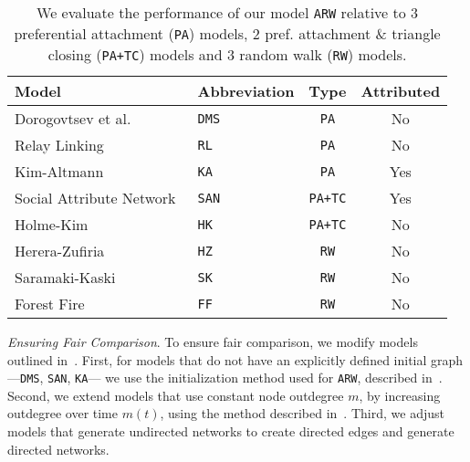 \begin{table}[t]
 \center
 {
  \begin{tabular}[c]{llcc} \toprule
  Model &  Abbreviation & Type & Attributed \\ \midrule
  Dorogovtsev et al.~\cite{dorogovtsev2000structure} & \texttt{DMS} & \texttt{PA} & No  \\
  Relay Linking~\cite{singh2017relay} 						  & \texttt{RL} & \texttt{PA} & No  \\
  Kim-Altmann~\cite{kim2017effect} 							  & \texttt{KA} & \texttt{PA} & Yes  \\ \midrule
  Social Attribute Network~\cite{gong2012evolution} 	  & \texttt{SAN} & \texttt{PA+TC} & Yes  \\
  Holme-Kim~\cite{holme2002growing} 						  & \texttt{HK} & \texttt{PA+TC} & No  \\ \midrule
  Herera-Zufiria~\cite{herrera2011generating} 				  & \texttt{HZ} & \texttt{RW} & No  \\
  Saramaki-Kaski~\cite{saramaki2004scale} 					  & \texttt{SK} & \texttt{RW} & No  \\
  Forest Fire~\cite{leskovec2005graphs} 					  & \texttt{FF} & \texttt{RW} & No  \\
   \bottomrule
  \end{tabular}
  \vspace{1mm}
  \caption{
  	  We evaluate the performance of our model \texttt{ARW} relative to 3 preferential attachment
	  (\texttt{PA}) models, 2 pref. attachment \& triangle closing (\texttt{PA+TC}) models and 3 random walk (\texttt{RW}) models.
  }
  \label{table:models}
 }
 \vspace{-10pt}
\end{table}
\textit{Ensuring Fair Comparison}. To ensure fair comparison, we modify models outlined in~.
First, for models that do not have an explicitly defined initial graph ---\texttt{DMS}, \texttt{SAN}, \texttt{KA}--- we use the
initialization method used for \texttt{ARW}, described in~. Second, we extend
models that use constant node outdegree $m$, by increasing outdegree over time $m(t)$,
using the method described in~. Third, we adjust models that generate undirected networks to
create directed edges and generate directed networks.

